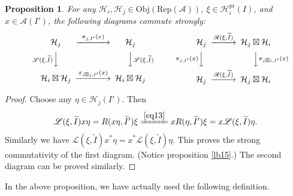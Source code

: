 \documentclass[11pt,b5paper,notitlepage]{article}
\theoremstyle{definition}
\theoremstyle{plain}
\newtheorem{pp}[df]{Proposition}
\newcommand{\mc}{\mathcal}
\newcommand{\wtd}{\widetilde}
\newcommand{\scr}{\mathscr}
\newcommand{\RepA}{\mathrm{Rep}(\mc A)}
\newcommand{\Obj}{\mathrm{Obj}}
\newcommand{\pr}{\mathrm{pr}}
\numberwithin{equation}{subsection}
\begin{document}
\begin{pp}\label{lb18}
	For any $\mc H_i,\mc H_j\in\Obj(\RepA)$, $\xi\in\mc H_i^\pr(I)$, and $x\in\mc A(I')$, the following diagrams commute strongly:
	\begin{gather}
	\begin{CD}
	\mc H_j @>~\pi_{j,I'}(x)~>> \mc H_j\\
	@V \scr L(\xi,\wtd I)  VV @VV \scr L(\xi,\wtd I) V\\
	\mc H_i\boxtimes\mc H_j @> \pi_{i\boxtimes j,I'}(x)>> \mc H_i\boxtimes\mc H_j
	\end{CD}\qquad\qquad\qquad
	\begin{CD}
	\mc H_j @> \scr R(\xi,\wtd I)  >> \mc H_j\boxtimes\mc H_i\\
	@V \pi_{j,I'}(x) VV @VV \pi_{j\boxtimes i,I'}(x) V\\
	\mc H_j @>\scr R(\xi,\wtd I) >> \mc H_j\boxtimes\mc H_i
	\end{CD}
	\end{gather}
\end{pp}

\begin{proof}
	Choose any $\eta\in\mc H_j(I')$. Then
	\begin{align*}
	\scr L(\xi,\wtd I)x\eta=R(x\eta,\wtd I')\xi \xlongequal{\eqref{eq13}} xR(\eta,\wtd I')\xi=x\scr L(\xi,\wtd I)\eta.
	\end{align*}
	Similarly we have $\scr L(\xi,\wtd I)x^*\eta=x^*\scr L(\xi,\wtd I)\eta$. This proves the strong commutativity of the first diagram. (Notice proposition \ref{lb15}.) The second diagram can be proved similarly.
\end{proof}


In the above proposition, we have actually used the following definition.
\end{document}
